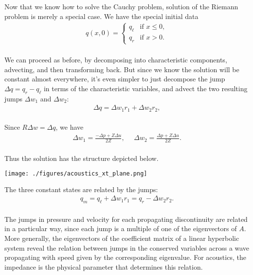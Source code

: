 \documentclass{SIAMbook2016}
\makeatletter
\def\maxwidth{\ifdim\Gin@nat@width>\linewidth\linewidth
    \else\Gin@nat@width\fi}
\let\Oldincludegraphics\includegraphics
\renewcommand{\includegraphics}[1]{\Oldincludegraphics[width=.8\maxwidth]{#1}}
\makeatother
\begin{document}
Now that we know how to solve the Cauchy problem, solution of the
Riemann problem is merely a special case. We have the special initial
data\\
\begin{align*}
q(x,0) = \begin{cases}
q_\ell & \text{if   } x \le 0, \\
q_r & \text{if   } x > 0.
\end{cases}
\end{align*}\\
We can proceed as before, by decomposing into characteristic components,
advecting, and then transforming back. But since we know the solution
will be constant almost everywhere, it's even simpler to just decompose
the jump \(\Delta q = q_r - q_\ell\) in terms of the characteristic
variables, and advect the two resulting jumps \(\Delta w_1\) and
\(\Delta w_2\):\\
\begin{align*}
\Delta q = \Delta w_1 r_1 + \Delta w_2 r_2,
\end{align*}\\
Since \(R\Delta w = \Delta q\), we have\\
\begin{align*}
\Delta w_1 = \frac{-\Delta p + Z\Delta u}{2Z}, \ \ \ \ \ \
\Delta w_2 = \frac{\Delta p + Z\Delta u}{2Z}.
\end{align*}\\
Thus the solution has the structure depicted below.

\texttt{[image: ./figures/acoustics\_xt\_plane.png]}

The three constant states are related by the jumps:\\
\begin{align}
q_m = q_\ell + \Delta w_1 r_1 = q_r - \Delta w_2 r_2.
\label{eq:acussol}
\end{align}\\
The jumps in pressure and velocity for each propagating discontinuity
are related in a particular way, since each jump is a multiple of one of
the eigenvectors of \(A\). More generally, the eigenvectors of the
coefficient matrix of a linear hyperbolic system reveal the relation
between jumps in the conserved variables across a wave propagating with
speed given by the corresponding eigenvalue. For acoustics, the
impedance is the physical parameter that determines this relation.
\end{document}
